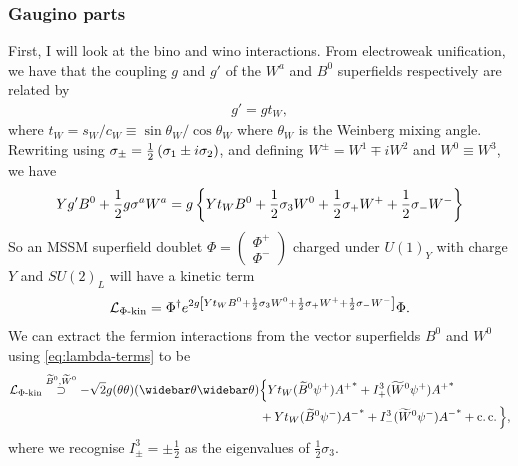 \documentclass[english, notitlepage]{article}
\begin{document}
        \subsubsection{Gaugino parts}
            First, I will look at the bino and wino interactions.
            From electroweak unification, we have that the coupling $g$ and $g'$ of the $W^a$ and $B^0$ superfields respectively are related by
            \begin{align}
                g' = g t_W,
            \end{align}
            where $t_W = s_W/c_W \equiv \sin\theta_W/\cos\theta_W$ where $\theta_W$ is the Weinberg mixing angle.
            Rewriting using $\sigma_\pm = \frac{1}{2}\left(\sigma_1 \pm i\sigma_2\right)$, and defining $W^\pm = W^1 \mp iW^2$ and $W^0 \equiv W^3$, we have
            \begin{align}
                Yg'B^0 + \frac{1}{2}g\sigma^a W^a = g\left\{ Yt_W B^0 + \frac{1}{2}\sigma_3 W^0 + \frac{1}{2}\sigma_+ W^+ + \frac{1}{2}\sigma_- W^- \right\}
            \end{align}
            So an MSSM superfield doublet $\Phi = \begin{pmatrix} \Phi^+ \\ \Phi^- \end{pmatrix}$ charged under ${U(1)}_Y$ with charge $Y$ and ${SU(2)}_L$ will have a kinetic term
            \begin{align}
                \mathcal{L}_{\Phi\text{-kin}} = \Phi^\dag e^{2g\left[ Yt_W B^0 + \frac{1}{2}\sigma_3 W^0 + \frac{1}{2}\sigma_+ W^+ + \frac{1}{2}\sigma_- W^- \right]} \Phi.
            \end{align}
            We can extract the fermion interactions from the vector superfields $B^0$ and $W^0$ using \cref{eq:lambda-terms} to be
            \begin{align} \nonumber
                \L_{\Phi\text{-kin}} \stackrel{\bino, \wino}{\supset} -\sqrt{2}g (\theta\theta)(\wbar\theta\wbar\theta) & \Big\{ Yt_W (\bino \psi^+) {A^+}^* + I^3_+ (\wino \psi^+) {A^+}^*       \\
                                                                                                                        & + Yt_W (\bino\psi^-){A^-}^* + I^3_- (\wino \psi^-){A^-}^* + \cc \Big\},
            \end{align}
            where we recognise $I^3_\pm = \pm \frac{1}{2}$ as the eigenvalues of $\frac{1}{2}\sigma_3$.
\end{document}
